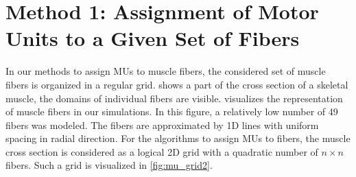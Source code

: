 \section{Method 1: Assignment of Motor Units to a Given Set of Fibers}\label{sec:method1_assignment}

In our methods to assign MUs to muscle fibers, the considered set of muscle fibers is organized in a regular grid.  shows 
a part of the cross section of a skeletal muscle, the domains of individual fibers are visible.  visualizes the representation of muscle fibers in our simulations. In this figure, a relatively low number of 49 fibers was modeled. The fibers are approximated by 1D lines with uniform spacing in radial direction. For the algorithms to assign MUs to fibers, the muscle cross section is considered as a logical 2D grid with a quadratic number of $n \times n$ fibers. Such a grid is visualized in \cref{fig:mu_grid2}.

